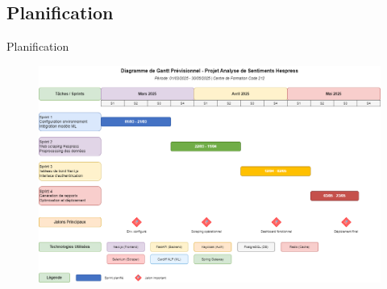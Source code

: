 \subsection{Planification}
\begin{frame}{Planification}

    \begin{figure}[H]
        \centering
        \includegraphics[scale=0.3]{assets/images/gantt-previsionnel.png}
    \end{figure}
\end{frame}





